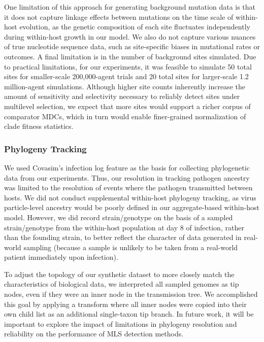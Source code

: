 One limitation of this approach for generating background mutation data is that it does not capture linkage effects between mutations on the time scale of within-host evolution, as the genetic composition of each site fluctuates independently during within-host growth in our model.
We also do not capture various nuances of true nucleotide sequence data, such as site-specific biases in mutational rates or outcomes.
A final limitation is in the number of background sites simulated.
Due to practical limitations, for our experiments, it was feasible to simulate 50 total sites for smaller-scale 200,000-agent trials and 20 total sites for larger-scale 1.2 million-agent simulations.
Although higher site counts inherently increase the amount of sensitivity and selectivity necessary to reliably detect sites under multilevel selection, we expect that more sites would support a richer corpus of comparator MDCs, which in turn would enable finer-grained normalization of clade fitness statistics.

\subsubsection{Phylogeny Tracking}

We used Covasim's infection log feature as the basis for collecting phylogenetic data from our experiments.
Thus, our resolution in tracking pathogen ancestry was limited to the resolution of events where the pathogen transmitted between hosts.
We did not conduct supplemental within-host phylogeny tracking, as virus particle-level ancestry would be poorly defined in our aggregate-based within-host model.
However, we did record strain/genotype on the basis of a sampled strain/genotype from the within-host population at day 8 of infection, rather than the founding strain, to better reflect the character of data generated in real-world sampling (because a sample is unlikely to be taken from a real-world patient immediately upon infection).

To adjust the topology of our synthetic dataset to more closely match the characteristics of biological data, we interpreted all sampled genomes as tip nodes, even if they were an inner node in the transmission tree.
We accomplished this goal by applying a transform where all inner nodes were copied into their own child list as an additional single-taxon tip branch.
In future work, it will be important to explore the impact of limitations in phylogeny resolution and reliability on the performance of MLS detection methods.

